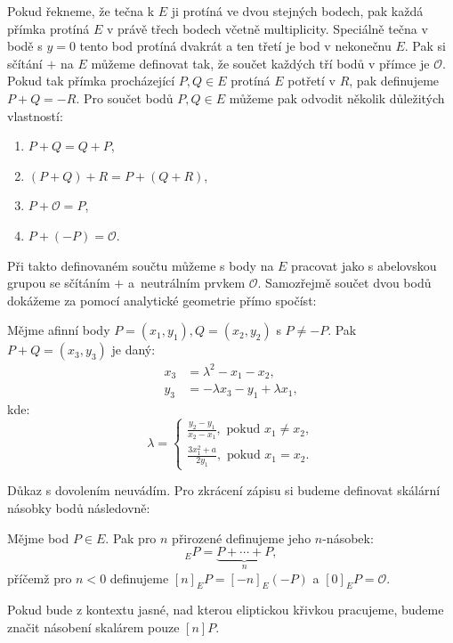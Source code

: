 \documentclass [12pt]{report}
\begin{document}
Pokud řekneme, že tečna k $E$ ji protíná ve dvou stejných bodech, pak každá přímka protíná $E$ v právě třech bodech včetně multiplicity. Speciálně tečna v bodě s $y=0$ tento bod protíná dvakrát a ten třetí je bod v nekonečnu $E$. Pak si sčítání $+$ na $E$ můžeme definovat tak, že součet každých tří bodů v přímce je $\mathcal{O}$. Pokud tak přímka procházející $P,Q \in E$ protíná $E$ potřetí v $R$, pak definujeme $P+ Q = -R$. Pro součet bodů $P,Q \in E$ můžeme pak odvodit několik důležitých vlastností:
\begin{enumerate}
\item $P + Q = Q + P$,
\item $(P + Q) + R =P + ( Q + R)$,
\item $P + \mathcal{O} = P$,
\item $P + (-P) = \mathcal{O}$.
\end{enumerate} 

Při takto definovaném součtu můžeme s body na $E$ pracovat jako s abelovskou grupou se sčítáním $+$ a~neutrálním prvkem $\mathcal{O}$. Samozřejmě součet dvou bodů dokážeme za pomocí analytické geometrie přímo spočíst:
\begin{veta}\label{sum}
Mějme afinní body $P = (x_1,y_1), Q = (x_2,y_2)$ s $P \neq -P$. Pak $P+Q = (x_3,y_3)$ je daný:
\begin{align*}
x_3 &= \lambda^2 - x_1 - x_2,\\
y_3 &= - \lambda x_3 - y_1 + \lambda x_1,
\end{align*}
kde:
\begin{equation*}
\lambda = \begin{cases}
\frac{y_2 - y_1}{x_2-x_1}, \text{ pokud } x_1 \neq x_2,\\
\frac{3x_1 ^2 + a}{2y_1}, \text{ pokud } x_1 = x_2.
\end{cases}
\end{equation*}

\end{veta}
Důkaz s dovolením neuvádím. Pro zkrácení zápisu si budeme definovat skálární násobky bodů následovně:
\begin{definice}
Mějme bod $P \in E$. Pak pro $n$ přirozené definujeme jeho $n$-násobek:
\begin{equation*}
[n]_E P = \underbrace{P+ \cdots + P}_{n},
\end{equation*}
příčemž pro $n < 0$ definujeme $[n]_E P = [-n]_E (-P)$ a $[0]_E P = \mathcal{O}$.
\end{definice}

Pokud bude z kontextu jasné, nad kterou eliptickou křivkou pracujeme, budeme značit násobení skalárem pouze $[n]P$.
\end{document}
